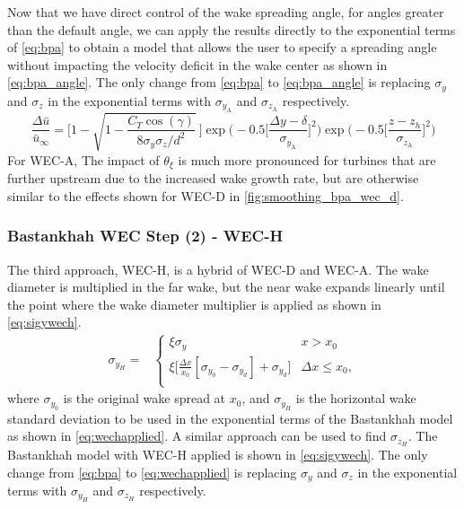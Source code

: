 \documentclass[journal abbreviation, manuscript]{copernicus}
\begin{document}
	Now that we have direct control of the wake spreading angle, for angles greater than the default angle, we can apply the results directly to the exponential terms of \ref{eq:bpa} to obtain a model that allows the user to specify a spreading angle without impacting the velocity deficit in the wake center as shown in \ref{eq:bpa_angle}. The only change from \ref{eq:bpa} to \ref{eq:bpa_angle} is replacing $\sigma_y$ and $\sigma_z$ in the exponential terms with $\sigma_{y_{\text{A}}}$ and $\sigma_{z_{\text{A}}}$ respectively.
	\begin{equation}
		\frac{\Delta \bar{u}}{\bar{u}_{\infty}} = \Bigg[1-\sqrt{1-\frac{C_T \cos{(\gamma)}}{8 \sigma_y \sigma_z/d^2}}~\Bigg] \exp{\bigg(-0.5\Big[\frac{\Delta y-\delta}{\sigma_{y_{\text{A}}}}\Big]^2\bigg)}\exp{\bigg(-0.5\Big[\frac{z-z_h}{\sigma_{z_{\text{A}}}}\Big]^2\bigg)}
		\label{eq:bpa_angle}
	\end{equation}
	For WEC-A, The impact of $\theta_\xi$ is much more pronounced for turbines that are further upstream due to the increased wake growth rate, but are otherwise similar to the effects shown for WEC-D in \ref{fig:smoothing_bpa_wec_d}.
	
	\subsubsection{Bastankhah WEC Step (2) - WEC-H}
	
	The third approach, WEC-H, is a hybrid of WEC-D and WEC-A. The wake diameter is multiplied in the far wake, but the near wake expands linearly until the point where the wake diameter multiplier is applied as shown in \ref{eq:sigywech}.
	\begin{align}\label{eq:sigywech}
		\sigma_{y_H} = &
		\begin{cases}
			\xi \sigma_y & x > x_0 \\
			\xi \big[\frac{\Delta x}{x_0}[\sigma_{y_0} - \sigma_{y_d}] + \sigma_{y_d} \big]& \Delta x \le x_0, \\
		\end{cases}
	\end{align}
	where $\sigma_{y_0}$ is the original wake spread at $x_0$, and $\sigma_{y_H}$ is the horizontal wake standard deviation to be used in the exponential terms of the Bastankhah model as shown in \ref{eq:wechapplied}. A similar approach can be used to find $\sigma_{z_H}$. The Bastankhah model with WEC-H applied is shown in \ref{eq:sigywech}. The only change from \ref{eq:bpa} to \ref{eq:wechapplied} is replacing $\sigma_y$ and $\sigma_z$ in the exponential terms with $\sigma_{y_{H}}$ and $\sigma_{z_{H}}$ respectively.
	
\end{document}
